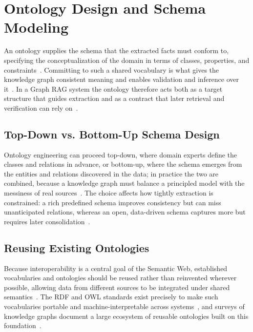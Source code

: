 \section{Ontology Design and Schema Modeling}
\label{sec:gr-ontology-design}

An ontology supplies the schema that the extracted facts must conform to,
specifying the conceptualization of the domain in terms of classes, properties,
and constraints~\cite{gruber1993ontology}. Committing to such a shared vocabulary
is what gives the knowledge graph consistent meaning and enables validation and
inference over it~\cite{gruber1993ontology, hogan2021kg}. In a Graph RAG system
the ontology therefore acts both as a target structure that guides extraction and
as a contract that later retrieval and verification can rely on~\cite{hogan2021kg,
pan2024unifying}.

\subsection{Top-Down vs. Bottom-Up Schema Design}

Ontology engineering can proceed top-down, where domain experts define the
classes and relations in advance, or bottom-up, where the schema emerges from the
entities and relations discovered in the data; in practice the two are combined,
because a knowledge graph must balance a principled model with the messiness of
real sources~\cite{hogan2021kg}. The choice affects how tightly extraction is
constrained: a rich predefined schema improves consistency but can miss
unanticipated relations, whereas an open, data-driven schema captures more but
requires later consolidation~\cite{hogan2021kg, ji2021kgsurvey}.

\subsection{Reusing Existing Ontologies}

Because interoperability is a central goal of the Semantic Web, established
vocabularies and ontologies should be reused rather than reinvented wherever
possible, allowing data from different sources to be integrated under shared
semantics~\cite{bernerslee2001semantic}. The RDF and OWL standards exist precisely
to make such vocabularies portable and machine-interpretable across
systems~\cite{w3c2014rdf, w3c2012owl}, and surveys of knowledge graphs document a
large ecosystem of reusable ontologies built on this
foundation~\cite{hogan2021kg}.
